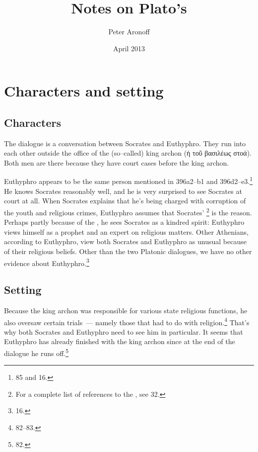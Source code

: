\documentclass[11pt]{article}
\begin{document}
\begin{titlepage}
\title{Notes on Plato's }
\author{Peter Aronoff}
\date{April 2013}
\maketitle
\end{titlepage}

\section{Characters and setting}

\subsection{Characters}

The dialogue is a conversation between Socrates and Euthyphro.  They run
into each other outside the office of the (so--called) king archon (ἡ τοῦ
βασιλέως στοά).  Both men are there because they have court cases before
the king archon.

Euthyphro appears to be the same person mentioned in 
396a2--b1 and 396d2--e3.\footnote{\citet{burnet1924} 85 and
\citet{bailly2003} 16.}  He knows Socrates reasonably well, and he is very
surprised to see Socrates at court at all.  When Socrates explains that
he's being charged with corruption of the youth and religious crimes,
Euthyphro assumes that Socrates' \footnote{For
a complete list of references to the , see
\citet{bailly2003} 32.} is the reason.  Perhaps partly because of the
, he sees Socrates as a kindred spirit: Euthyphro views
himself as a prophet and an expert on religious matters.  Other Athenians,
according to Euthyphro, view both Socrates and Euthyphro as unusual because
of their religious beliefs.  Other than the two Platonic dialogues, we have
no other evidence about Euthyphro.\footnote{\citet{bailly2003} 16.}

\subsection{Setting}

Because the king archon was responsible for various state religious
functions, he also oversaw certain trials~--- namely those that had to do
with religion.\footnote{\citet{burnet1924} 82--83.}  That's why both
Socrates and Euthyphro need to see him in particular.  It seems that
Euthyphro has already finished with the king archon since at the end of the
dialogue he runs off.\footnote{\citet{burnet1924} 82.}
\end{document}
